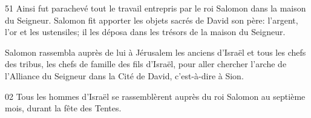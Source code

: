 51 Ainsi fut parachevé tout le travail entrepris par le roi Salomon dans la maison du Seigneur. Salomon fit apporter les objets sacrés de David son père: l’argent, l’or et les ustensiles; il les déposa dans les trésors de la maison du Seigneur.

Salomon rassembla auprès de lui à Jérusalem les anciens d’Israël et tous les chefs des tribus, les chefs de famille des fils d’Israël, pour aller chercher l’arche de l’Alliance du Seigneur dans la Cité de David, c’est-à-dire à Sion.

02 Tous les hommes d’Israël se rassemblèrent auprès du roi Salomon au septième mois, durant la fête des Tentes.